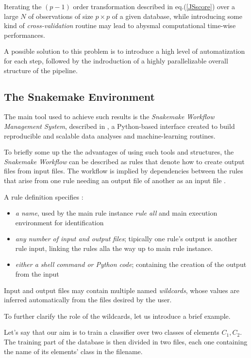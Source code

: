 \documentclass[12pt,openright,twoside,a4paper]{book}
\begin{document}
Iterating the $(p-1)$ order transformation described in eq.(\ref{JSscore}) over a large $N$ of observations of size $	p \times p$ of a given database, while introducing some kind of \textit{cross-validation} routine may lead to abysmal computational time-wise performances.
\vspace{5mm}

A possible solution to this problem is to introduce a high level of automatization for each step, followed by the indroduction of a highly parallelizable overall structure of the pipeline.

\subsection{The Snakemake Environment}

The main tool used to achieve such results is the \textit{ Snakemake Workflow Management System}, described in \cite{SnakeMake}, a Python-based interface created to build reproducible and scalable data analyses and machine-learning routines.

To briefly some up the the advantages of using such tools and structures, the \textit{Snakemake Workflow} can be described as rules that denote how to create output files from input files. The workflow is implied by dependencies between the rules that arise from one rule needing an output file of another as an input file \cite{SnakeMake}.

A rule definition specifies :

\begin{itemize}
\item \textit{a name}, used by the main rule instance \textit{rule all} and main execution environment for identification
\item \textit{any number of input and output files}; tipically one rule's output is another rule input, linking the rules alla the way up to main rule instance.
\item  \textit{either a shell command or Python code}; containing the creation of the output from the input
\end{itemize} 

Input and output files may contain multiple named \textit{wildcards}, whose values are inferred automatically from the files desired by the user.
\vspace{5mm}

To further clarify the role of the wildcards, let us introduce a brief example.

Let's say that our aim is to train a classifier over two classes of elements $C_1,C_2$. The training part of the database is then divided in two files, each one containing the name of its elements' class in the filename.
\end{document}
